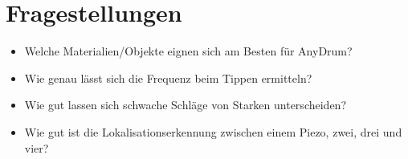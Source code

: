 \section*{Fragestellungen}
\begin{itemize}
	\item Welche Materialien/Objekte eignen sich am Besten für AnyDrum?
	\item Wie genau lässt sich die Frequenz beim Tippen ermitteln?
	\item Wie gut lassen sich schwache Schläge von Starken unterscheiden?
	\item Wie gut ist die Lokalisationserkennung zwischen einem Piezo, zwei, drei und vier?
\end{itemize}